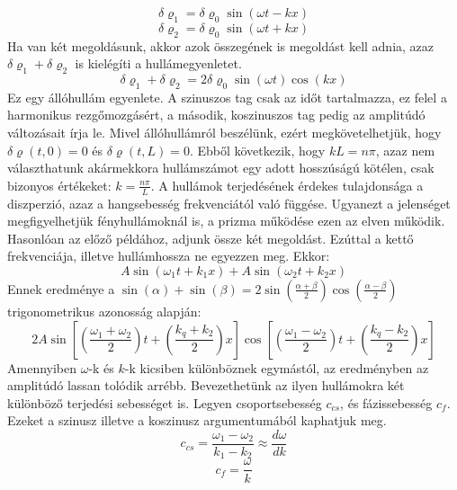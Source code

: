 \documentclass[a4paper,12pt]{article}
\begin{document}
\begin{equation}
\delta\varrho_1=\delta\varrho_0\sin(\omega t-kx)
\end{equation}
\begin{equation}
\delta\varrho_2=\delta\varrho_0\sin(\omega t+kx)
\end{equation}
Ha van két megoldásunk, akkor azok összegének is megoldást kell adnia, azaz $\delta\varrho_1+\delta\varrho_2$ is kielégíti a hullámegyenletet.
\begin{equation}
\delta\varrho_1+\delta\varrho_2=2\delta\varrho_0\sin(\omega t)\cos(kx)
\end{equation}
Ez egy állóhullám egyenlete. A szinuszos tag csak az időt tartalmazza, ez felel a harmonikus rezgőmozgásért, a második, koszinuszos tag pedig az amplitúdó változásait írja le. Mivel állóhullámról beszélünk, ezért megkövetelhetjük, hogy $\delta\varrho(t,0)=0$ és $\delta\varrho(t,L)=0$. Ebből következik, hogy $kL=n\pi$, azaz nem választhatunk akármekkora hullámszámot egy adott hosszúságú kötélen, csak bizonyos értékeket: $k=\frac{n\pi}{L}$.
A hullámok terjedésének érdekes tulajdonsága a diszperzió, azaz a hangsebesség frekvenciától való függése. Ugyanezt a jelenséget megfigyelhetjük fényhullámoknál is, a prizma működése ezen az elven működik. Hasonlóan az előző példához, adjunk össze két megoldást. Ezúttal a kettő frekvenciája, illetve hullámhossza ne egyezzen meg. Ekkor:
\begin{equation}
A\sin(\omega_1t+k_1x)+A\sin(\omega_2t+k_2x)
\end{equation}
Ennek eredménye a $\sin(\alpha)+\sin(\beta)=2\sin\left(\frac{\alpha+\beta}{2}\right)\cos\left(\frac{\alpha-\beta}{2}\right)$ trigonometrikus azonosság alapján:
\begin{equation}
2A\sin\left[\left(\frac{\omega_1+\omega_2}{2}\right)t+\left(\frac{k_q+k_2}{2}\right)x\right]\cos\left[\left(\frac{\omega_1-\omega_2}{2}\right)t+\left(\frac{k_q-k_2}{2}\right)x\right]
\end{equation}
Amennyiben $\omega$-k és $k$-k kicsiben különböznek egymástól, az eredményben az amplitúdó lassan tolódik arrébb. Bevezethetünk az ilyen hullámokra két különböző terjedési sebességet is. Legyen csoportsebesség $c_{cs}$, és fázissebesség $c_f$. Ezeket a szinusz illetve a koszinusz argumentumából kaphatjuk meg.
\begin{equation}
c_{cs}=\frac{\omega_1-\omega_2}{k_1-k_2}\approx\frac{d\omega}{dk}
\end{equation}
\begin{equation}
c_f=\frac{\omega}{k}
\end{equation}
\end{document}
